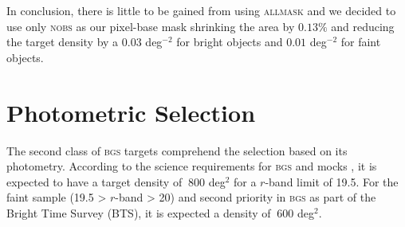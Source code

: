 \documentclass[fleqn,usenatbib]{mnras}
\newcommand{\ALLMASK}{\textsc{allmask}\xspace}
\newcommand{\BGS}{\textsc{bgs}\xspace}
\newcommand{\NOBS}{\textsc{nobs}\xspace}
\begin{document}
In conclusion, there is little to be gained from using \ALLMASK and we decided to use only \NOBS as our pixel-base mask shrinking the area by $0.13 \%$ and reducing the target density by a $0.03$ deg$^{-2}$ for bright objects and $0.01$ deg$^{-2}$ for faint objects.

\section{Photometric Selection}\label{sec:photo_select}

The second class of \BGS targets comprehend the selection based on its photometry. According to the science requirements for \BGS and mocks \citep{Smith:2017tzz}, it is expected to have a target density of $~800$ deg$^{2}$ for a $r$-band limit of 19.5. For the faint sample (19.5 > $r$-band > 20) and second priority in \BGS as part of the Bright Time Survey (BTS), it is expected a density of $~600$ deg$^{2}$.
\end{document}
